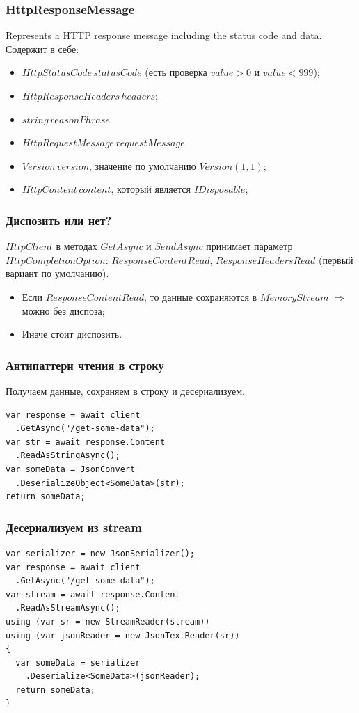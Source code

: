 \documentclass{beamer}
\begin{document}
\begin{frame}
\frametitle{\href{https://docs.microsoft.com/en-us/dotnet/api/system.net.http.httpresponsemessage?view=netcore-2.2}{HttpResponseMessage}}
Represents a HTTP response message including the status code and data.
\newline
\newline
Содержит в себе:
\begin{itemize}
	\item $HttpStatusCode\,statusCode$ (есть проверка $value > 0$ и $value < 999$);
	\item $HttpResponseHeaders\,headers$;
	\item $string\,reasonPhrase$
	\item $HttpRequestMessage\,requestMessage$
	\item $Version\,version$, значение по умолчанию $Version(1, 1)$;
	\item $HttpContent\,content$, который является $IDisposable$;
\end{itemize}
\end{frame}

\begin{frame}
\frametitle{Диспозить или нет?}
$HttpClient$ в методах $GetAsync$ и $SendAsync$ принимает параметр  $HttpCompletionOption$: $ResponseContentRead$, $ResponseHeadersRead$ (первый вариант по умолчанию).
\newline
\begin{itemize}
	\item Если $ResponseContentRead$, то данные сохраняются в $MemoryStream$ $\Rightarrow$ можно без диспоза;
	\item Иначе стоит диспозить. 
\end{itemize}
\end{frame}

\begin{frame}[fragile]
\frametitle{Антипаттерн чтения в строку}
Получаем данные, сохраняем в строку и десериализуем.
\newline
\begin{lstlisting}
var response = await client
  .GetAsync("/get-some-data");
var str = await response.Content
  .ReadAsStringAsync();
var someData = JsonConvert
  .DeserializeObject<SomeData>(str);
return someData;
\end{lstlisting}
\end{frame}

\begin{frame}[fragile]
\frametitle{Десериализуем из stream}
\begin{lstlisting}
var serializer = new JsonSerializer();
var response = await client
  .GetAsync("/get-some-data");
var stream = await response.Content
  .ReadAsStreamAsync();
using (var sr = new StreamReader(stream))
using (var jsonReader = new JsonTextReader(sr))
{
  var someData = serializer
    .Deserialize<SomeData>(jsonReader);
  return someData;
}
\end{lstlisting}
\end{frame}
\end{document}

